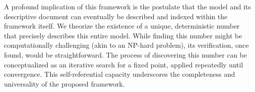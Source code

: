 \documentclass{article}
\begin{document}
A profound implication of this framework is the postulate that the model and its descriptive document can eventually be described and indexed within the framework itself. We theorize the existence of a unique, deterministic number that precisely describes this entire model. While finding this number might be computationally challenging (akin to an NP-hard problem), its verification, once found, would be straightforward. The process of discovering this number can be conceptualized as an iterative search for a fixed point, applied repeatedly until convergence. This self-referential capacity underscores the completeness and universality of the proposed framework.
\end{document}
